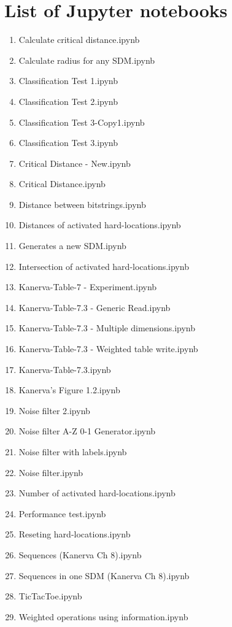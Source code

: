 %

\chapter*{List of Jupyter notebooks}


\begin{enumerate}
  \item Calculate critical distance.ipynb
  \item Calculate radius for any SDM.ipynb
  \item Classification Test 1.ipynb
  \item Classification Test 2.ipynb
  \item Classification Test 3-Copy1.ipynb
  \item Classification Test 3.ipynb
  \item Critical Distance - New.ipynb
  \item Critical Distance.ipynb
  \item Distance between bitstrings.ipynb
  \item Distances of activated hard-locations.ipynb
  \item Generates a new SDM.ipynb
  \item Intersection of activated hard-locations.ipynb
  \item Kanerva-Table-7 - Experiment.ipynb
  \item Kanerva-Table-7.3 - Generic Read.ipynb
  \item Kanerva-Table-7.3 - Multiple dimensions.ipynb
  \item Kanerva-Table-7.3 - Weighted table write.ipynb
  \item Kanerva-Table-7.3.ipynb
  \item Kanerva's Figure 1.2.ipynb
  \item Noise filter 2.ipynb
  \item Noise filter A-Z 0-1 Generator.ipynb
  \item Noise filter with labels.ipynb
  \item Noise filter.ipynb
  \item Number of activated hard-locations.ipynb
  \item Performance test.ipynb
  \item Reseting hard-locations.ipynb
  \item Sequences (Kanerva Ch 8).ipynb
  \item Sequences in one SDM (Kanerva Ch 8).ipynb
  \item TicTacToe.ipynb
  \item Weighted operations using information.ipynb
\end{enumerate}
